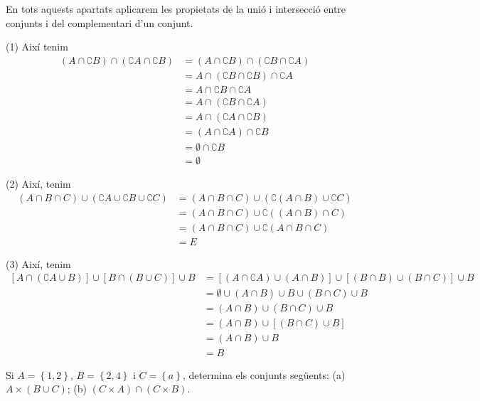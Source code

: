 \begin{solucio}
En tots aquests apartats aplicarem les propietats de la unió i intersecció entre conjunts i del complementari d'un conjunt.

(1) Així tenim%
\begin{align*}
(A\cap \complement B)\cap (\complement A\cap \complement B)& =(A\cap
\complement B)\cap (\complement B\cap \complement A) \\
& =A\cap (\complement B\cap \complement B)\cap \complement A \\
& =A\cap \complement B\cap \complement A \\
& =A\cap (\complement B\cap \complement A) \\
& =A\cap (\complement A\cap \complement B) \\
& =(A\cap \complement A)\cap \complement B \\
& =\emptyset \cap \complement B \\
& =\emptyset
\end{align*}

(2) Així, tenim%
\begin{align*}
(A\cap B\cap C)\cup (\complement A\cup \complement B\cup \complement C)&
=(A\cap B\cap C)\cup (\complement \left( A\cap B\right) \cup \complement C)
\\
& =(A\cap B\cap C)\cup \complement \left( (A\cap B)\cap C\right) \\
& =(A\cap B\cap C)\cup \complement \left( A\cap B\cap C\right) \\
& =E
\end{align*}

(3) Així, tenim%
\begin{align*}
\left[ A\cap (\complement A\cup B)\right] \cup \left[ B\cap (B\cup C)\right]
\cup B& =\left[ (A\cap \complement A)\cup (A\cap B)\right] \cup \left[
(B\cap B)\cup (B\cap C)\right] \cup B \\
& =\emptyset \cup (A\cap B)\cup B\cup (B\cap C)\cup B \\
& =(A\cap B)\cup (B\cap C)\cup B \\
& =(A\cap B)\cup \left[ (B\cap C)\cup B\right] \\
& =(A\cap B)\cup B \\
& =B
\end{align*}
\end{solucio}

\begin{exercici}
Si $A=\left\{ 1,2\right\} $, $B=\left\{ 2,4\right\} $ i $C=\left\{ a\right\}
$, determina els conjunts següents: (a) $A\times (B\cup C)$; (b) $%
(C\times A)\cap (C\times B)$.
\end{exercici}

